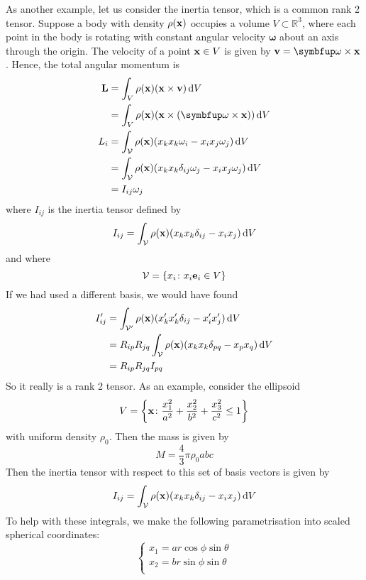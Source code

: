 \begin{example}
	As another example, let us consider the inertia tensor, which is a common rank 2 tensor.
	Suppose a body with density \(\rho(\vb x)\) occupies a volume \(V \subset \mathbb R^3\), where each point in the body is rotating with constant angular velocity \(\bm\omega\) about an axis through the origin.
	The velocity of a point \(\vb x \in V\) is given by \(\vb v = \bm \omega \times \vb x\).
	Hence, the total angular momentum is
	\begin{align*}
		\vb L & = \int_V \rho(\vb x) (\vb x \times \vb v) \dd{V}                                         \\
		      & = \int_V \rho(\vb x) (\vb x \times (\bm \omega \times \vb x)) \dd{V}                     \\
		L_i   & = \int_{\mathcal V} \rho(\vb x) (x_k x_k \omega_i - x_i x_j \omega_j) \dd{V}             \\
		      & = \int_{\mathcal V} \rho(\vb x) (x_k x_k \delta_{ij} \omega_j - x_i x_j \omega_j) \dd{V} \\
		      & = I_{ij}\omega_j
	\end{align*}
	where \(I_{ij}\) is the inertia tensor defined by
	\[
		I_{ij} = \int_{\mathcal V} \rho(\vb x) (x_k x_k \delta_{ij} - x_i x_j) \dd{V}
	\]
	and where
	\[
		\mathcal V = \qty{ x_i \colon x_i \vb e_i \in V }
	\]
	If we had used a different basis, we would have found
	\begin{align*}
		I_{ij}' & = \int_{\mathcal V'} \rho(\vb x) (x_k' x_k' \delta_{ij} - x_i' x_j') \dd{V}          \\
		        & = R_{ip} R_{jq} \int_{\mathcal V} \rho(\vb x) (x_k x_k \delta_{pq} - x_p x_q) \dd{V} \\
		        & = R_{ip} R_{jq} I_{pq}
	\end{align*}
	So it really is a rank 2 tensor.
	As an example, consider the ellipsoid
	\[
		V = \qty{ \vb x \colon \frac{x_1^2}{a^2} + \frac{x_2^2}{b^2} + \frac{x_3^2}{c^2} \leq 1 }
	\]
	with uniform density \(\rho_0\).
	Then the mass is given by
	\[
		M = \frac{4}{3}\pi \rho_0 abc
	\]
	Then the inertia tensor with respect to this set of basis vectors is given by
	\[
		I_{ij} = \int_{\mathcal V} \rho(\vb x) (x_k x_k \delta_{ij} - x_i x_j) \dd{V}
	\]
	To help with these integrals, we make the following parametrisation into scaled spherical coordinates:
	\[
		\left\{ \begin{array}{l}
			x_1 = ar\cos\phi\sin\theta \\
			x_2 = br\sin\phi\sin\theta \\

\end{array}\]
\end{example}
